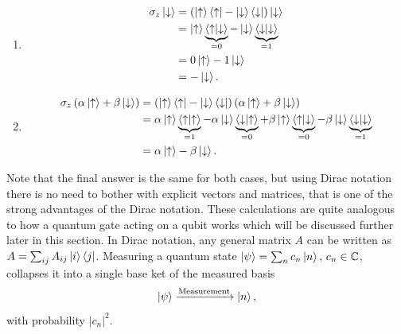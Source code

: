 \begin{enumerate}[label=\textbf{\alph*)}]
\item
\begin{equation}
\begin{aligned}
\sigma_z \ket{\downarrow} &= (\ket{\uparrow}\bra{\uparrow} - \ket{\downarrow}\bra{\downarrow})\ket{\downarrow} \\&= \ket{\uparrow}\underbrace{\bra{\uparrow}\ket{\downarrow}}_{ = 0} - \ket{\downarrow}\underbrace{\bra{\downarrow}\ket{\downarrow}}_{ = 1} \\&= 0\ket{\uparrow} - 1\ket{\downarrow} \\&= -\ket{\downarrow}.
\end{aligned}
\end{equation}
\item 
\begin{equation}
\begin{aligned}
\sigma_z \left(\alpha\ket{\uparrow} + \beta\ket{\downarrow} \right) &= \left( \ket{\uparrow}\bra{\uparrow} - \ket{\downarrow}\bra{\downarrow} \right) \left(\alpha\ket{\uparrow} + \beta\ket{\downarrow} \right) \\&= 
\alpha\ket{\uparrow}\underbrace{\bra{\uparrow}\ket{\uparrow}}_{ = 1} - \alpha\ket{\downarrow}\underbrace{\bra{\downarrow}\ket{\uparrow}}_{ = 0}
+
\beta\ket{\uparrow}\underbrace{\bra{\uparrow}\ket{\downarrow}}_{ = 0} - \beta\ket{\downarrow}\underbrace{\bra{\downarrow}\ket{\downarrow}}_{ = 1}\\&= \alpha\ket{\uparrow} - \beta\ket{\downarrow}.
\end{aligned}
\end{equation}
\end{enumerate}
Note that the final answer is the same for both cases, but using Dirac notation there is no need to bother with explicit vectors and matrices, that is one of the strong advantages of the Dirac notation. These calculations are quite analogous to how a quantum gate acting on a qubit works which will be discussed further later in this section. In Dirac notation, any general matrix $A$ can be written as $A = \sum_{ij} A_{ij}\ket{i}\bra{j}$. Measuring a quantum state $\ket{\psi} = \sum_{n}c_n\ket{n},\, c_n\in \mathbb{C}$, collapses it into a single base ket of the measured basis
\begin{equation}
\ket{\psi} \xrightarrow{\text{Measurement}} \ket{n},
\end{equation}
with probability $|c_n|^2$. 



